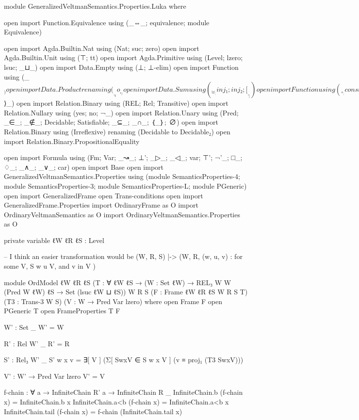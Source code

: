 \begin{spverbatim}
module GeneralizedVeltmanSemantics.Properties.Luka where

open import Function.Equivalence using (_⇔_; equivalence; module Equivalence)

open import Agda.Builtin.Nat using (Nat; suc; zero)
open import Agda.Builtin.Unit using (⊤; tt)
open import Agda.Primitive using (Level; lzero; lsuc; _⊔_)
open import Data.Empty using (⊥; ⊥-elim)
open import Function using (_$_)
open import Data.Product renaming (_,_ to _⸴_)
open import Data.Sum using (_⊎_; inj₁; inj₂; [_,_])
open import Function using (_∘_; const; case_of_; id)
open import Function.Equality using (_⟨$⟩_)
open import Relation.Binary using (REL; Rel; Transitive)
open import Relation.Nullary using (yes; no; ¬_)
open import Relation.Unary using (Pred; _∈_; _∉_; Decidable; Satisfiable; _⊆_; _∩_; ｛_｝; ∅)
open import Relation.Binary using (Irreflexive) renaming (Decidable to Decidable₂)
open import Relation.Binary.PropositionalEquality

open import Formula using (Fm; Var; _↝_; ⊥'; _▷_; _◁_; var; ⊤'; ¬'_; □_; ♢_; _∧_; _∨_; car)
open import Base
open import GeneralizedVeltmanSemantics.Properties
  using (module SemanticsProperties-4;
    module SemanticsProperties-3;
    module SemanticsProperties-L; module PGeneric)
open import GeneralizedFrame
open Trans-conditions
open import GeneralizedFrame.Properties
import OrdinaryFrame as O
import OrdinaryVeltmanSemantics as O
import OrdinaryVeltmanSemantics.Properties as O

private
  variable
    ℓW ℓR ℓS : Level

-- I think an easier transformation would be (W, R, S) |-> (W, R, { (w, u, v) : for some V, S w u V, and v in V })

module OrdModel
  {ℓW ℓR ℓS}
  (T : ∀ {ℓW ℓS} → (W : Set ℓW) → REL₃ W W (Pred W ℓW) ℓS → Set (lsuc ℓW ⊔ ℓS))
  {W R S}
  (F : Frame {ℓW} {ℓR} {ℓS} W R S T)
  (T3 : Trans-3 W S)
  (V : W → Pred Var lzero)
  where
  open Frame F
  open PGeneric T
  open FrameProperties T F

  W' : Set _
  W' = W

  R' : Rel W' _
  R' = R

  S' : Rel₃ W' _
  S' w x v = ∃[ V ] (Σ[ SwxV ∈ S w x V ] (v ≡ proj₁ (T3 SwxV)))

  V' : W' → Pred Var lzero
  V' = V

  f-chain : ∀ {a} → InfiniteChain R' a → InfiniteChain R _
  InfiniteChain.b (f-chain x) = InfiniteChain.b x
  InfiniteChain.a<b (f-chain x) = InfiniteChain.a<b x
  InfiniteChain.tail (f-chain x) = f-chain (InfiniteChain.tail x)


\end{spverbatim}
